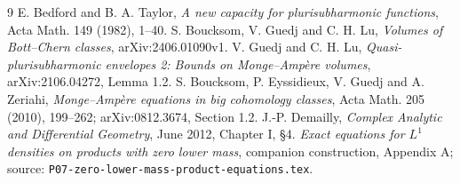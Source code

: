 \documentclass[11pt]{article}
\theoremstyle{remark}\newtheorem{remark}[theorem]{Remark}
\begin{document}
\begin{thebibliography}{9}
 E. Bedford and B. A. Taylor,
\emph{A new capacity for plurisubharmonic functions},
Acta Math. 149 (1982), 1--40.
 S. Boucksom, V. Guedj and C. H. Lu,
\emph{Volumes of Bott--Chern classes}, arXiv:2406.01090v1.
 V. Guedj and C. H. Lu,
\emph{Quasi-plurisubharmonic envelopes 2: Bounds on Monge--Amp\`ere volumes},
arXiv:2106.04272, Lemma 1.2.
 S. Boucksom, P. Eyssidieux, V. Guedj and A. Zeriahi,
\emph{Monge--Amp\`ere equations in big cohomology classes},
Acta Math. 205 (2010), 199--262; arXiv:0812.3674, Section 1.2.
 J.-P. Demailly,
\emph{Complex Analytic and Differential Geometry}, June 2012,
Chapter I, \S4.
 \emph{Exact equations for $L^1$ densities on products
with zero lower mass}, companion construction, Appendix A;
source: \texttt{P07-zero-lower-mass-product-equations.tex}.
\end{thebibliography}
\end{document}
